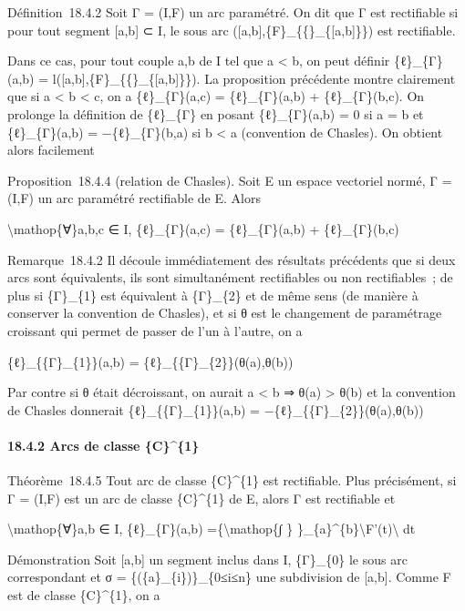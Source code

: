 \documentclass[]{article}
\begin{document}
Définition~18.4.2 Soit Γ = (I,F) un arc paramétré. On dit que Γ est
rectifiable si pour tout segment {[}a,b{]} ⊂ I, le sous arc
({[}a,b{]},\{F\}\_\{\{\textbar{}\}\_\{{[}a,b{]}\}\}) est rectifiable.

Dans ce cas, pour tout couple a,b de I tel que a \textless{} b, on peut
définir \{ℓ\}\_\{Γ\}(a,b) =
l({[}a,b{]},\{F\}\_\{\{\textbar{}\}\_\{{[}a,b{]}\}\}). La proposition
précédente montre clairement que si a \textless{} b \textless{} c, on a
\{ℓ\}\_\{Γ\}(a,c) = \{ℓ\}\_\{Γ\}(a,b) + \{ℓ\}\_\{Γ\}(b,c). On prolonge
la définition de \{ℓ\}\_\{Γ\} en posant \{ℓ\}\_\{Γ\}(a,b) = 0 si a = b
et \{ℓ\}\_\{Γ\}(a,b) = −\{ℓ\}\_\{Γ\}(b,a) si b \textless{} a (convention
de Chasles). On obtient alors facilement

Proposition~18.4.4 (relation de Chasles). Soit E un espace vectoriel
normé, Γ = (I,F) un arc paramétré rectifiable de E. Alors

\textbackslash{}mathop\{∀\}a,b,c ∈ I, \{ℓ\}\_\{Γ\}(a,c) =
\{ℓ\}\_\{Γ\}(a,b) + \{ℓ\}\_\{Γ\}(b,c)

Remarque~18.4.2 Il découle immédiatement des résultats précédents que si
deux arcs sont équivalents, ils sont simultanément rectifiables ou non
rectifiables~; de plus si \{Γ\}\_\{1\} est équivalent à \{Γ\}\_\{2\} et
de même sens (de manière à conserver la convention de Chasles), et si θ
est le changement de paramétrage croissant qui permet de passer de l'un
à l'autre, on a

\{ℓ\}\_\{\{Γ\}\_\{1\}\}(a,b) = \{ℓ\}\_\{\{Γ\}\_\{2\}\}(θ(a),θ(b))

Par contre si θ était décroissant, on aurait a \textless{} b ⇒ θ(a)
\textgreater{} θ(b) et la convention de Chasles donnerait
\{ℓ\}\_\{\{Γ\}\_\{1\}\}(a,b) = −\{ℓ\}\_\{\{Γ\}\_\{2\}\}(θ(a),θ(b))

\paragraph{18.4.2 Arcs de classe \{C\}\^{}\{1\}}

Théorème~18.4.5 Tout arc de classe \{C\}\^{}\{1\} est rectifiable. Plus
précisément, si Γ = (I,F) est un arc de classe \{C\}\^{}\{1\} de E,
alors Γ est rectifiable et

\textbackslash{}mathop\{∀\}a,b ∈ I, \{ℓ\}\_\{Γ\}(a,b)
=\{\textbackslash{}mathop\{∫ \}
\}\_\{a\}\^{}\{b\}\textbackslash{}\textbar{}F'(t)\textbackslash{}\textbar{}
dt

Démonstration Soit {[}a,b{]} un segment inclus dans I, \{Γ\}\_\{0\} le
sous arc correspondant et σ = \{(\{a\}\_\{i\})\}\_\{0≤i≤n\} une
subdivision de {[}a,b{]}. Comme F est de classe \{C\}\^{}\{1\}, on a
\end{document}
